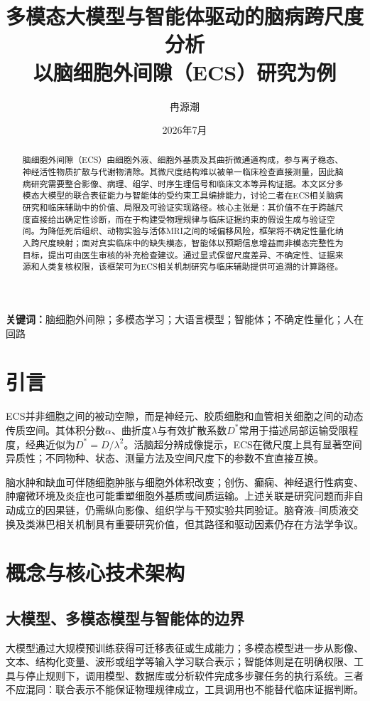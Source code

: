 ﻿\documentclass[11pt,a4paper]{article}
\title{\heiti 多模态大模型与智能体驱动的脑病跨尺度分析\\\large 以脑细胞外间隙（ECS）研究为例}
\author{\heiti 冉源潮}
\date{2026年7月}
\begin{document}
\maketitle

\begin{abstract}
脑细胞外间隙（ECS）由细胞外液、细胞外基质及其曲折微通道构成，参与离子稳态、神经活性物质扩散与代谢物清除。其微尺度结构难以被单一临床检查直接测量，因此脑病研究需要整合影像、病理、组学、时序生理信号和临床文本等异构证据。本文区分多模态大模型的联合表征能力与智能体的受约束工具编排能力，讨论二者在ECS相关脑病研究和临床辅助中的价值、局限及可验证实现路径。核心主张是：其价值不在于跨越尺度直接给出确定性诊断，而在于构建受物理规律与临床证据约束的假设生成与验证空间。为降低死后组织、动物实验与活体MRI之间的域偏移风险，框架将不确定性量化纳入跨尺度映射；面对真实临床中的缺失模态，智能体以预期信息增益而非模态完整性为目标，提出可由医生审核的补充检查建议。通过显式保留尺度差异、不确定性、证据来源和人类复核权限，该框架可为ECS相关机制研究与临床辅助提供可追溯的计算路径。
\end{abstract}

\noindent\textbf{关键词：}脑细胞外间隙；多模态学习；大语言模型；智能体；不确定性量化；人在回路

\tableofcontents
\clearpage

\section{引言}
ECS并非细胞之间的被动空隙，而是神经元、胶质细胞和血管相关细胞之间的动态传质空间。其体积分数$\alpha$、曲折度$\lambda$与有效扩散系数$D^*$常用于描述局部运输受限程度，经典近似为$D^*=D/\lambda^2$\cite{sykova2008,nicholson1998}。活脑超分辨成像提示，ECS在微尺度上具有显著空间异质性\cite{tonnesen2018}；不同物种、状态、测量方法及空间尺度下的参数不宜直接互换。

脑水肿和缺血可伴随细胞肿胀与细胞外体积改变；创伤、癫痫、神经退行性病变、肿瘤微环境及炎症也可能重塑细胞外基质或间质运输。上述关联是研究问题而非自动成立的因果链，仍需纵向影像、组织学与干预实验共同验证。脑脊液--间质液交换及类淋巴相关机制具有重要研究价值，但其路径和驱动因素仍存在方法学争议\cite{iliff2012,mestre2020}。

\section{概念与核心技术架构}
\subsection{大模型、多模态模型与智能体的边界}
大模型通过大规模预训练获得可迁移表征或生成能力；多模态模型进一步从影像、文本、结构化变量、波形或组学等输入学习联合表示；智能体则是在明确权限、工具与停止规则下，调用模型、数据库或分析软件完成多步骤任务的执行系统。三者不应混同：联合表示不能保证物理规律成立，工具调用也不能替代临床证据判断。
\end{document}
